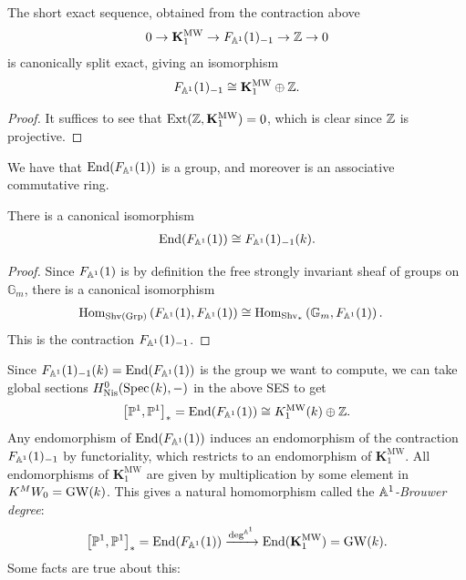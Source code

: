 \documentclass[11pt,openany]{book}
\providecommand{\MW}{\mathrm{MW}}
\providecommand{\KMW}{\mathbf{K}^\mathrm{MW}}
\begin{document}
\begin{proposition} The short exact sequence, obtained from the contraction above
\begin{align*}
    0 \to \KMW_1 \to F_{\A^1}(1)_{-1} \to \Z \to 0
\end{align*}
is canonically split exact, giving an isomorphism
\begin{align*}
    F_{\A^1}(1)_{-1} \cong \KMW_1 \oplus \Z.
\end{align*}
\end{proposition}
\begin{proof} It suffices to see that $\Ext(\Z, \KMW_1) = 0$, which is clear since $\mathbb{Z}$ is projective.
\end{proof}

\begin{proposition} We have that $\mathrm{End}(F_{\mathbb{A}^1}(1))$ is a group, and moreover is an associative commutative ring.
\end{proposition}

\begin{proposition}\label{prop:end-FA1-global-sections-contraction} 
There is a canonical isomorphism
\begin{align*}
    \mathrm{End}(F_{\mathbb{A}^1}(1)) \cong F_{\mathbb{A}^1}(1)_{-1}(k).
\end{align*}
\end{proposition}
\begin{proof} Since $F_{\mathbb{A}^1}(1)$ is by definition the free strongly invariant sheaf of groups on $\mathbb{G}_m$, there is a canonical isomorphism
\begin{align*}
    \mathrm{Hom}_{\mathrm{Shv}(\mathrm{Grp})} \left( F_{\mathbb{A}^1}(1), F_{\mathbb{A}^1}(1) \right) &\cong \mathrm{Hom}_{\mathrm{Shv}_\ast} \left( \mathbb{G}_m, F_{\mathbb{A}^1}(1) \right).
\end{align*}
This is the contraction $F_{\mathbb{A}^1}(1)_{-1}$.
\end{proof}



Since $F_{\mathbb{A}^1}(1)_{-1}(k) = \mathrm{End}(F_{\mathbb{A}^1}(1))$ is the group we want to compute, we can take global sections $H^0_{\mathrm{Nis}}(\text{Spec}\hspace{0.1em}(k),-)$ in the above SES to get
\begin{equation}\label{eqn:global-sections-speck-fa1-contracted}
\begin{aligned}
    \left[ \P^1,\P^1 \right]_\ast = \End (F_{\A^1}(1)) \cong K_1^\MW(k) \oplus \Z.
\end{aligned}
\end{equation}
%
Any endomorphism of $\mathrm{End}(F_{\mathbb{A}^1}(1))$ induces an endomorphism of the contraction $F_{\mathbb{A}^1}(1)_{-1}$ by functoriality, which restricts to an endomorphism of $\KMW_1$. All endomorphisms of $\KMW_1$ are given by multiplication by some element in $K^MW_0 = \mathrm{GW}(k)$. This gives a natural homomorphism called the \textit{$\mathbb{A}^1$-Brouwer degree}:
\begin{align*}
    \left[ \P^1,\P^1 \right]_\ast = \End(F_{\A^1}(1)) \xto{\deg^{\A^1}} \End(\KMW_1) = \GW(k).
\end{align*}
%
Some facts are true about this:
\end{document}
